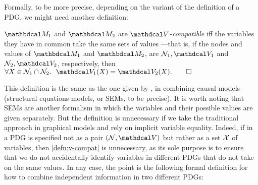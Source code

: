 
\TODO


Formally, to be more precise, depending on the variant
of the definition of a PDG, we might need another definition:	
\begin{defn}
        \label{defn:v-compat}
	$\dg M_1$ and $\dg M_2$ are $\V$-\emph{compatible}
	iff the variables they have in common take the same sets of values%
    ---that is, if the nodes and values of $\dg M_1$ and $\dg M_2$,
	are $\N_1, \V_1$ and $\N_2, \V_2$, respectively, then
    $
	\forall X \in \N_1 \cap \N_2.~~
		\V_1( X) = \V_2 (X). \qedhere
	$
\end{defn}

This definition is the same as the one given by \citet{halpern-combining-causal-models}, in combining causal models (structural equations models, or SEMs, to be precise).
It is worth noting that SEMs are another formalism in which the variables and their possible values are given separately. 
But the definition is unnecessary if we take the traditional approach in graphical models and rely on implicit variable equality.
Indeed, if in a PDG is specified not as a pair $(\N, \V)$ but rather as a set $\mathcal X$ of variables, then \cref{defn:v-compat} is unnecessary, as its sole purpose is to ensure that we do not accidentally identify variables in different PDGs that do not take on the same values. 
%
In any case, the point is the following formal definition for how to combine independent information in two different PDGs:

